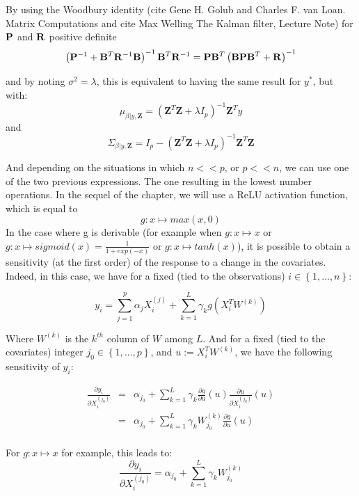 \medskip

By using the Woodbury identity (cite Gene H. Golub and Charles F. van Loan. Matrix Computations and cite Max Welling The Kalman filter, Lecture Note) for ${\bf P}$ and ${\bf R}$ positive definite
$$
\left({\bf P}^{-1} + {\bf B}^T {\bf R}^{-1} {\bf B} \right)^{-1}{\bf B}^T {\bf R}^{-1} =
{\bf P}{\bf B}^T \left( {\bf B} {\bf P} {\bf B}^T + {\bf R}\right)^{-1}
$$

and by noting $\sigma^2 = \lambda$, this is equivalent to having the same result for $y^*$, but with: 
$$
\mu_{\beta | y, \textbf{Z}} =  \left( \textbf{Z}^T\textbf{Z} + \lambda I_p\right)^{-1}\textbf{Z}^Ty
$$
and 
$$
\Sigma_{\beta | y, \textbf{Z}} = I_p -  \left( \textbf{Z}^T\textbf{Z} + \lambda I_p\right)^{-1}\textbf{Z}^T\textbf{Z}
$$

And depending on the situations in which $n << p$, or $p << n$, we can use one of the two previous expressions. The one resulting in the lowest number operations. In the sequel of the chapter, we will use a ReLU activation function, which is equal to
$$
g: x \mapsto max(x, 0)
$$ 
In the case where g is derivable (for example when 
$
g: x \mapsto x
$ or 
$
g: x \mapsto sigmoid(x) = \frac{1}{1 + exp(-x)}
$
or 
$
g: x \mapsto tanh(x)
$), it is possible to obtain a sensitivity (at the first order) of the response to a change in the covariates. Indeed, in this case, we have for a fixed (tied to the observations) $i \in \left \lbrace 1, \ldots, n \right \rbrace $: 

$$
y_i = \sum_{j = 1}^p \alpha_j X_i^{(j)} + \sum_{k = 1}^L \gamma_k g(X_i^T W^{(k)})
$$

Where $W^{(k)}$ is the $k^{th}$ column of $W$ among $L$. And for a fixed (tied to the covariates) integer $j_0 \in \left \lbrace 1, \ldots, p \right \rbrace$, and $u := X_i^T W^{(k)}$, we have the following sensitivity of $y_i$: 

\begin{eqnarray*}
\frac{\partial y_i}{\partial X_i^{(j_0)}} &=& \alpha_{j_0} + \sum_{k = 1}^L \gamma_k \frac{\partial g}{\partial u}(u)\frac{\partial u}{\partial X_i^{(j_0)}}(u) \\
 &=& \alpha_{j_0} + \sum_{k = 1}^L \gamma_k W_{j_0}^{(k)} \frac{\partial g}{\partial u}(u)\\
\end{eqnarray*}

For $g: x \mapsto x$ for example, this leads to: 
$$
\frac{\partial y_i}{\partial X_i^{(j_0)}} = \alpha_{j_0} + \sum_{k = 1}^L \gamma_k W_{j_0}^{(k)}
$$

